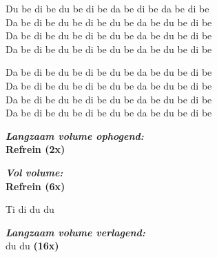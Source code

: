 Du be di be du be di be da be di be da be di be\\
Da be di be du be di be du be da be du be di be\\
Da be di be du be di be du be da be du be di be\\
Da be di be du be di be du be da be du be di be

Da be di be du be di be du be da be du be di be\\
Da be di be du be di be du be da be du be di be\\
Da be di be du be di be du be da be du be di be\\
Da be di be du be di be du be da be du be di be

\textit{\textbf{Langzaam volume ophogend:}}\\
\textbf{Refrein (2x)}

\textit{\textbf{Vol volume:}}\\
\textbf{Refrein (6x)}

Ti di du du 

\textit{\textbf{Langzaam volume verlagend:}}\\
du du \textbf{(16x)}